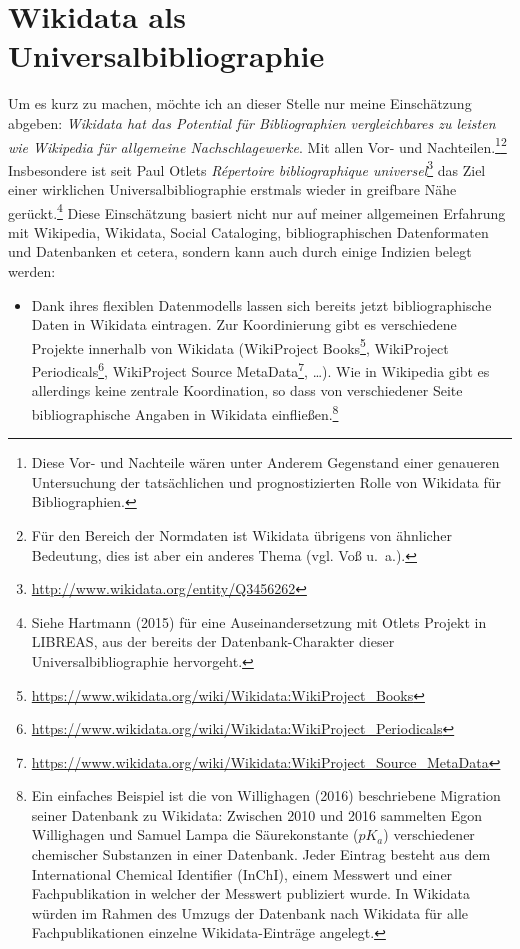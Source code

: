 \documentclass[a4paper,
fontsize=11pt,
oneside,
numbers=noperiodatend,
parskip=half-,
bibliography=totoc,
final
]{scrartcl}
\providecommand{\tightlist}{%
  \setlength{\itemsep}{0pt}\setlength{\parskip}{0pt}}
\begin{document}
\section*{Wikidata als
Universalbibliographie}\label{wikidata-als-universalbibliographie}

Um es kurz zu machen, möchte ich an dieser Stelle nur meine Einschätzung
abgeben: \emph{Wikidata hat das Potential für Bibliographien
vergleichbares zu leisten wie Wikipedia für allgemeine
Nachschlagewerke}. Mit allen Vor- und Nachteilen.\footnote{Diese Vor-
  und Nachteile wären unter Anderem Gegenstand einer genaueren
  Untersuchung der tatsächlichen und prognostizierten Rolle von Wikidata
  für Bibliographien.}\footnote{Für den Bereich der Normdaten ist
  Wikidata übrigens von ähnlicher Bedeutung, dies ist aber ein anderes
  Thema (vgl. Voß u.~a.).} Insbesondere ist seit Paul Otlets \textit{Répertoire
bibliographique universel}\footnote{\url{http://www.wikidata.org/entity/Q3456262}}
das Ziel einer wirklichen Universalbibliographie erstmals wieder in
greifbare Nähe gerückt.\footnote{Siehe Hartmann (2015) für eine
  Auseinandersetzung mit Otlets Projekt in LIBREAS, aus der bereits der
  Datenbank-Charakter dieser Universalbibliographie hervorgeht.} Diese
Einschätzung basiert nicht nur auf meiner allgemeinen Erfahrung mit
Wikipedia, Wikidata, Social Cataloging, bibliographischen Datenformaten
und Datenbanken et cetera, sondern kann auch durch einige Indizien belegt
werden:

\begin{itemize}
\tightlist
\item
  Dank ihres flexiblen Datenmodells lassen sich bereits jetzt
  bibliographische Daten in Wikidata eintragen. Zur Koordinierung gibt
  es verschiedene Projekte innerhalb von Wikidata (WikiProject
  Books\footnote{\url{https://www.wikidata.org/wiki/Wikidata:WikiProject_Books}},
  WikiProject Periodicals\footnote{\url{https://www.wikidata.org/wiki/Wikidata:WikiProject_Periodicals}},
  WikiProject Source MetaData\footnote{\url{https://www.wikidata.org/wiki/Wikidata:WikiProject_Source_MetaData}},
  \ldots{}). Wie in Wikipedia gibt es allerdings keine zentrale
  Koordination, so dass von verschiedener Seite bibliographische Angaben
  in Wikidata einfließen.\footnote{Ein einfaches Beispiel ist die von
    Willighagen (2016) beschriebene Migration seiner Datenbank zu
    Wikidata: Zwischen 2010 und 2016 sammelten Egon Willighagen und
    Samuel Lampa die Säurekonstante (\(pK_a\)) verschiedener chemischer
    Substanzen in einer Datenbank. Jeder Eintrag besteht aus dem
    International Chemical Identifier (InChI), einem Messwert und einer
    Fachpublikation in welcher der Messwert publiziert wurde. In
    Wikidata würden im Rahmen des Umzugs der Datenbank nach Wikidata für
    alle Fachpublikationen einzelne Wikidata-Einträge angelegt.}
\end{itemize}
\end{document}
